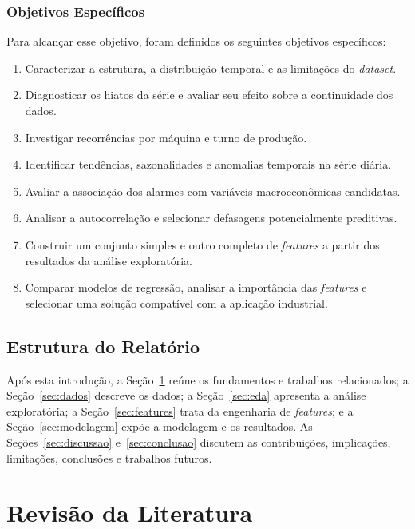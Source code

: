 \subsubsection{Objetivos Específicos}

Para alcançar esse objetivo, foram definidos os seguintes objetivos específicos:

\begin{enumerate}
    \item Caracterizar a estrutura, a distribuição temporal e as limitações do \textit{dataset}.
    \item Diagnosticar os hiatos da série e avaliar seu efeito sobre a continuidade dos dados.
    \item Investigar recorrências por máquina e turno de produção.
    \item Identificar tendências, sazonalidades e anomalias temporais na série diária.
    \item Avaliar a associação dos alarmes com variáveis macroeconômicas candidatas.
    \item Analisar a autocorrelação e selecionar defasagens potencialmente preditivas.
    \item Construir um conjunto simples e outro completo de \textit{features} a partir dos resultados da análise exploratória.
    \item Comparar modelos de regressão, analisar a importância das \textit{features} e selecionar uma solução compatível com a aplicação industrial.
\end{enumerate}

\subsection{Estrutura do Relatório}

Após esta introdução, a Seção~\ref{sec:revisao-literatura} reúne os fundamentos e trabalhos relacionados; a Seção~\ref{sec:dados} descreve os dados; a Seção~\ref{sec:eda} apresenta a análise exploratória; a Seção~\ref{sec:features} trata da engenharia de \textit{features}; e a Seção~\ref{sec:modelagem} expõe a modelagem e os resultados. As Seções~\ref{sec:discussao} e~\ref{sec:conclusao} discutem as contribuições, implicações, limitações, conclusões e trabalhos futuros.

\section{Revisão da Literatura}
\label{sec:revisao-literatura}

